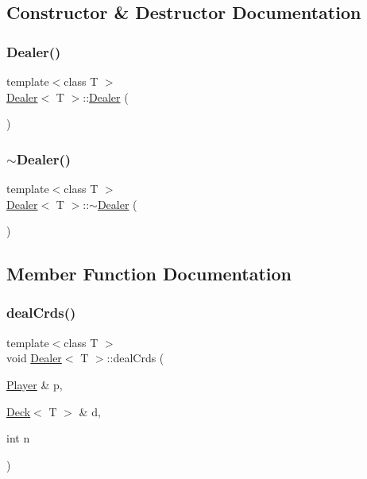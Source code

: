 \subsection{Constructor \& Destructor Documentation}
\mbox{\label{class_dealer_a6b2f0b132a7aac7650308365f9bb5cd7}} 
\subsubsection{\texorpdfstring{Dealer()}{Dealer()}}
{\footnotesize\ttfamily template$<$class T $>$ \\
\mbox{\hyperlink{class_dealer}{Dealer}}$<$ T $>$\+::\mbox{\hyperlink{class_dealer}{Dealer}} (\begin{DoxyParamCaption}{ }\end{DoxyParamCaption})}

\mbox{\label{class_dealer_a775914655b99de05565bcc2e117f47c5}} 
\subsubsection{\texorpdfstring{$\sim$\+Dealer()}{~Dealer()}}
{\footnotesize\ttfamily template$<$class T $>$ \\
\mbox{\hyperlink{class_dealer}{Dealer}}$<$ T $>$\+::$\sim$\mbox{\hyperlink{class_dealer}{Dealer}} (\begin{DoxyParamCaption}{ }\end{DoxyParamCaption})}



\subsection{Member Function Documentation}
\mbox{\label{class_dealer_a26da04b81fcbeaa6c7fb68e04de5bc8e}} 
\subsubsection{\texorpdfstring{deal\+Crds()}{dealCrds()}}
{\footnotesize\ttfamily template$<$class T $>$ \\
void \mbox{\hyperlink{class_dealer}{Dealer}}$<$ T $>$\+::deal\+Crds (\begin{DoxyParamCaption}\item[{\mbox{\hyperlink{class_player}{Player}} \&}]{p,  }\item[{\mbox{\hyperlink{class_deck}{Deck}}$<$ T $>$ \&}]{d,  }\item[{int}]{n }\end{DoxyParamCaption})}


